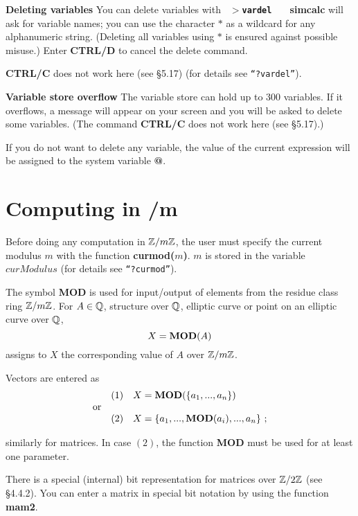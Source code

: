 \leer\leer
{\bf Deleting variables}
\leer
You can delete variables with
\leer
{\tt
  {\bf $>$vardel}\ \  \care
}
\leer
{\bf simcalc} will ask for variable names; you can use the character $*$ as a
wildcard for any alphanumeric string. (Deleting all variables using $*$ is ensured
against possible misuse.) Enter {\bf CTRL/D} to cancel the delete command.

{\bf CTRL/C} does not work here (see \S 5.17) (for details see {\tt ``?vardel''}).

\leer\leer
{\bf Variable store overflow}
\leer
The variable store can hold up to 300 variables. If it overflows, a message will
appear on your screen and you will be asked to delete some variables. (The command
{\bf CTRL/C} does not work here (see \S 5.17).)

If you do not want to delete any variable, the value of the current expression
will be assigned to the system variable {\bf @}.

\newpage


\section{Computing in \Z /m\Z }
Before doing any computation in $\mbox{$\mathbb Z$} /m\mbox{$\mathbb Z$}$, the user must specify the current modulus
$m$ with the function {\bf curmod($m$)}. $m$ is stored in the variable $curModulus$
(for details see {\tt ``?curmod''}).

The symbol {\bf MOD} is used for input/output of elements from the residue class ring
$\mbox{$\mathbb Z$} /m\mbox{$\mathbb Z$}$. For $A \in \mbox{$\mathbb Q$}$, structure over $\mbox{$\mathbb Q$}$, elliptic curve or point on an elliptic
curve over $\mbox{$\mathbb Q$}$,
$$
X = \mbox{\bf MOD}(A)
$$
assigns to $X$ the corresponding value of $A$ over $\mbox{$\mathbb Z$}/m\mbox{$\mathbb Z$}$.

Vectors are entered as
$$\begin{array}{lrl}
 & (1) & X  =  \mbox{\bf MOD}(\{ a_1,...,a_n\} ) \\
\mbox{or} & & \\
 & (2) & X  = \{ a_1,...,\mbox{\bf MOD}(a_i),...,a_n\}\ ;
\end{array}$$

similarly for matrices. In case $(2)$, the function {\bf MOD} must be used for at least
one parameter.

There is a special (internal) bit representation for matrices over $\mbox{$\mathbb Z$}/2\mbox{$\mathbb Z$}$
(see \S 4.4.2).
You can enter a matrix in special bit notation by using the function {\bf mam2}.

